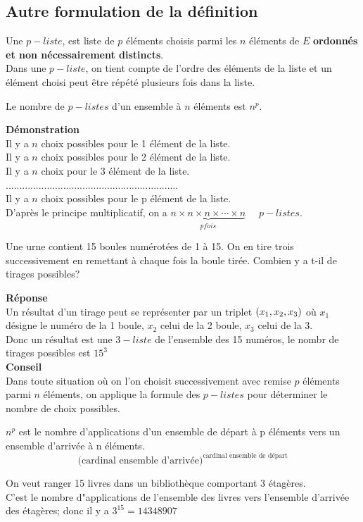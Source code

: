 \subsection*{Autre formulation de la définition}
Une $p-liste$, est liste  de $ p $ éléments choisis parmi les $ n $ éléments de $ E $ \textbf{ordonnés et non nécessairement distincts}.\\
Dans une $ p-liste $, on tient compte de l'ordre des éléments de la liste et un élément choisi peut être répété plusieurs fois dans la liste.
\begin{theorem}
Le nombre de $ p-listes $ d'un ensemble à $ n $ éléments est $ n^{p}. $
\end{theorem}
\textbf{Démonstration}\\
Il y a $ n $ choix possibles pour  le 1 élément de la liste.\\
Il y a $ n $ choix possibles pour  le 2 élément de la liste.\\
Il y a $ n $ choix pour  le 3 élément de la liste.\\
...............................................................\\
Il y a $ n $ choix possibles pour le p élément de la liste.\\
D'après le principe multiplicatif, on a $\underbrace{ n \times n \times n \times \cdots \times n }_{p fois}$  $\quad p-listes $.
\begin{exercice}
Une urne contient 15 boules numérotées de 1 à 15. On en tire trois successivement en remettant à chaque fois la boule tirée.  Combien y a t-il de tirages  possibles? 
\end{exercice}
\textbf{Réponse}\\
Un résultat d'un tirage peut se représenter par un triplet $ \left(x_{1}, x_{2},x_{3}\right) $  où $ x_{1} $ désigne le numéro de la 1 boule, $ x_{2} $ celui de la 2 boule, $ x_{3} $ celui de la 3.\\
Donc un résultat est une $ 3-liste $ de l'ensemble des 15 numéros, le nombr de tirages possibles est $ 15^{3} $\\
\textbf{Conseil}\\
Dans toute situation où on l'on choisit successivement avec remise $ p $ éléments parmi $ n $ éléments, on applique la formule des $ p-listes $  pour déterminer le nombre de choix possibles.
\begin{remark}
$ n^{p} $ est le nombre d'applications d'un ensemble de départ à p éléments vers un ensemble d'arrivée à n éléments.
\[\textrm{(cardinal ensemble d'arrivée)}^{\textrm{cardinal ensemble de départ}} \]
\end{remark}
\begin{example}
On veut ranger 15 livres dans un bibliothèque comportant 3 étagères.\\
C'est le nombre d"applications de l'ensemble des livres vers l'ensemble d'arrivée des étagères; donc il y a  $ 3^{15}=14 348 907 $
\end{example}


